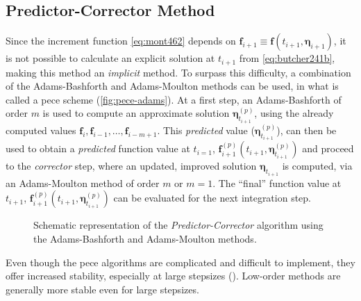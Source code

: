 \subsection{Predictor-Corrector Method}\label{ssec:predictor-corrector-method}

Since the increment function \autoref{eq:mont462} depends on 
$\bm{f}_{i+1} \equiv \bm{f}(t_{i+1}, \bm{\eta}_{i+1})$, it is not possible to 
calculate an explicit solution at $t_{i+1}$ from \autoref{eq:butcher241b}, 
making this method an \emph{implicit} method. To surpass this difficulty, a combination 
of the Adams-Bashforth and Adams-Moulton methods can be used, in what is called a 
\gls{pece} scheme (\autoref{fig:pece-adams}). 
At a first step, an Adams-Bashforth of order $m$ is used to compute an approximate 
solution $\bm{\eta}^{(p)}_{t_{i+1}}$, using the already computed values 
$\bm{f}_i, \bm{f}_{i-1}, \dots , \bm{f}_{i-m+1}$. This \emph{predicted} value 
($\bm{\eta}^{(p)}_{t_{i+1}}$), can then be used to obtain a \emph{predicted} 
function value at $t_{i=1}$, $\bm{f}^{(p)}_{i+1}(t_{i+1},\bm{\eta}^{(p)}_{t_{i+1}})$ 
and proceed to the \emph{corrector} step, where an updated, improved solution 
$\bm{\eta}_{t_{i+1}}$ is computed, via an Adams-Moulton method of order $m$ or 
$m=1$. The ``final'' function value at $t_{i+1}$, 
$\bm{f}^{(p)}_{i+1}(t_{i+1},\bm{\eta}^{(p)}_{t_{i+1}})$ can be evaluated for the 
next integration step.

\begin{figure}
  \centering
  
  \caption{Schematic representation of the \emph{Predictor-Corrector} algorithm using the Adams-Bashforth and Adams-Moulton methods.}
  \label{fig:pece-adams}
\end{figure}

Even though the \gls{pece} algorithms are complicated and difficult to implement, 
they offer increased stability, especially at large stepsizes (\cite{Montenbruck2000}).
Low-order methods are generally more stable even for large stepsizes.
